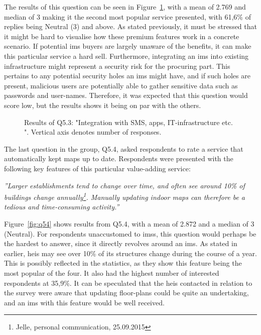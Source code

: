 The results of this question can be seen in Figure~\ref{fig:q53}, with a mean of 2.769 and median of 3 making it the second most popular service presented, with 61,6\% of replies being Neutral (3) and above. As stated previously, it must be stressed that it might be hard to visualise how these premium features work in a concrete scenario. If potential \gls{ims} buyers are largely unaware of the benefits, it can make this particular service a hard sell. Furthermore, integrating an \gls{ims} into existing infrastructure might represent a security risk for the procuring part. This pertains to any potential security holes an \gls{ims} might have, and if such holes are present, malicious users are potentially able to gather sensitive data such as passwords and user-names. Therefore, it was expected that this question would score low, but the results shows it being on par with the others.  

\begin{figure}[H]
    \centering
    \caption{Results of Q5.3: "Integration with SMS, apps, IT-infrastructure etc.
". Vertical axis denotes number of responses.}
    \label{fig:q53}
\end{figure}

The last question in the group, Q5.4, asked respondents to rate a service that automatically kept maps up to date. Respondents were presented with the following key features of this particular value-adding service:

\begin{displayquote}
\textit{''Larger establishments tend to change over time, and often see around 10\% of buildings change annually\footnote{Jelle, personal communication, 25.09.2015}. Manually updating indoor maps can therefore be a tedious and time-consuming activity.''}
\end{displayquote}

Figure~\ref{fig:q54} shows results from Q5.4, with a mean of 2.872 and a median of 3 (Neutral). For respondents unaccustomed to \glspl{ims}, this question would perhaps be the hardest to answer, since it directly revolves around an \gls{ims}. As stated in earlier, \glspl{hei} may see over 10\% of its structures change during the course of a year. This is possibly reflected in the statistics, as they show this feature being the most popular of the four. It also had the highest number of interested respondents at 35,9\%. It can be speculated that the \glspl{hei} contacted in relation to the survey were aware that updating floor-plans could be quite an undertaking, and an \gls{ims} with this feature would be well received. 


